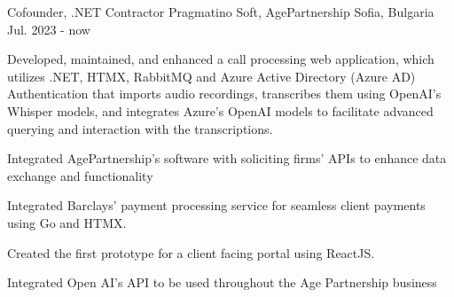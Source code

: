 

\begin{cventries}

  \cventry
    {Cofounder, .NET Contractor} %
    {Pragmatino Soft, AgePartnership} %
    {Sofia, Bulgaria} %
    {Jul. 2023 - now} %
    {
      \begin{cvitems} %
        \item {Developed, maintained, and enhanced a call processing web application, which utilizes .NET, HTMX, RabbitMQ and Azure Active Directory (Azure AD) Authentication that imports audio recordings, transcribes them using OpenAI's Whisper models, and integrates Azure's OpenAI models to facilitate advanced querying and interaction with the transcriptions.}
        \vspace{0.7em} %
         \item {Integrated AgePartnership's software with soliciting firms' APIs to enhance data exchange and functionality }
         \vspace{0.7em} %
        \item {Integrated Barclays' payment processing service for seamless client payments using Go and HTMX.}
        \vspace{0.7em} %
        \item {Created the first prototype for a client facing portal using ReactJS. }
        \vspace{0.7em} %
        \item {Integrated Open AI's API to be used throughout the Age Partnership business}
      \end{cvitems}
    }


\end{cventries}
